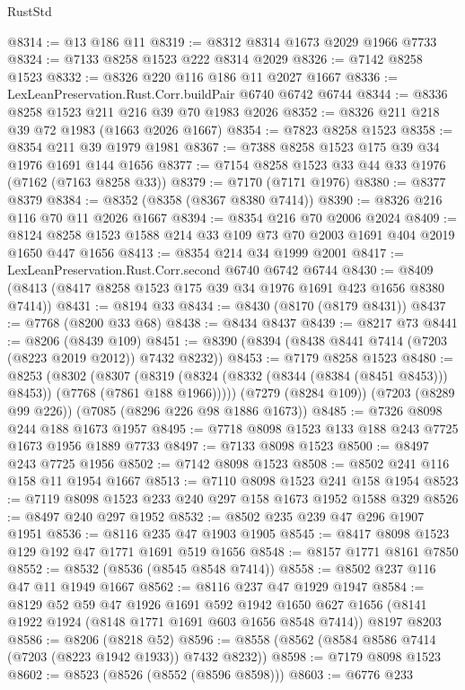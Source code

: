 \begin{lexlean}{RustStd}
\begin{coremodule}
@8314 := @13 @186 @11
@8319 := @8312 @8314 @1673 @2029 @1966 @7733
@8324 := @7133 @8258 @1523 @222 @8314 @2029
@8326 := @7142 @8258 @1523
@8332 := @8326 @220 @116 @186 @11 @2027 @1667
@8336 := LexLeanPreservation.Rust.Corr.buildPair @6740 @6742 @6744
@8344 := @8336 @8258 @1523 @211 @216 @39 @70 @1983 @2026
@8352 := @8326 @211 @218 @39 @72 @1983 (@1663 @2026 @1667)
@8354 := @7823 @8258 @1523
@8358 := @8354 @211 @39 @1979 @1981
@8367 := @7388 @8258 @1523 @175 @39 @34 @1976 @1691 @144 @1656
@8377 := @7154 @8258 @1523 @33 @44 @33 @1976 (@7162 (@7163 @8258 @33))
@8379 := @7170 (@7171 @1976)
@8380 := @8377 @8379
@8384 := @8352 (@8358 (@8367 @8380 @7414))
@8390 := @8326 @216 @116 @70 @11 @2026 @1667
@8394 := @8354 @216 @70 @2006 @2024
@8409 := @8124 @8258 @1523 @1588 @214 @33 @109 @73 @70 @2003 @1691 @404 @2019 @1650 @447 @1656
@8413 := @8354 @214 @34 @1999 @2001
@8417 := LexLeanPreservation.Rust.Corr.second @6740 @6742 @6744
@8430 := @8409 (@8413 (@8417 @8258 @1523 @175 @39 @34 @1976 @1691 @423 @1656 @8380 @7414))
@8431 := @8194 @33
@8434 := @8430 (@8170 (@8179 @8431))
@8437 := @7768 (@8200 @33 @68)
@8438 := @8434 @8437
@8439 := @8217 @73
@8441 := @8206 (@8439 @109)
@8451 := @8390 (@8394 (@8438 @8441 @7414 (@7203 (@8223 @2019 @2012)) @7432 @8232))
@8453 := @7179 @8258 @1523
@8480 := @8253
    (@8302
      (@8307
        (@8319 (@8324 (@8332 (@8344 (@8384 (@8451 @8453))) @8453)) (@7768 (@7861 @188 @1966)))))
    (@7279 (@8284 @109))
    (@7203 (@8289 @99 @226))
    (@7085 (@8296 @226 @98 @1886 @1673))
@8485 := @7326 @8098 @244 @188 @1673 @1957
@8495 := @7718 @8098 @1523 @133 @188 @243 @7725 @1673 @1956 @1889 @7733
@8497 := @7133 @8098 @1523
@8500 := @8497 @243 @7725 @1956
@8502 := @7142 @8098 @1523
@8508 := @8502 @241 @116 @158 @11 @1954 @1667
@8513 := @7110 @8098 @1523 @241 @158 @1954
@8523 := @7119 @8098 @1523 @233 @240 @297 @158 @1673 @1952 @1588 @329
@8526 := @8497 @240 @297 @1952
@8532 := @8502 @235 @239 @47 @296 @1907 @1951
@8536 := @8116 @235 @47 @1903 @1905
@8545 := @8417 @8098 @1523 @129 @192 @47 @1771 @1691 @519 @1656
@8548 := @8157 @1771 @8161 @7850
@8552 := @8532 (@8536 (@8545 @8548 @7414))
@8558 := @8502 @237 @116 @47 @11 @1949 @1667
@8562 := @8116 @237 @47 @1929 @1947
@8584 := @8129
    @52
    @59
    @47
    @1926
    @1691
    @592
    @1942
    @1650
    @627
    @1656
    (@8141 @1922 @1924 (@8148 @1771 @1691 @603 @1656 @8548 @7414))
    @8197
    @8203
@8586 := @8206 (@8218 @52)
@8596 := @8558 (@8562 (@8584 @8586 @7414 (@7203 (@8223 @1942 @1933)) @7432 @8232))
@8598 := @7179 @8098 @1523
@8602 := @8523 (@8526 (@8552 (@8596 @8598)))
@8603 := @6776 @233

\end{coremodule}
\end{lexlean}
